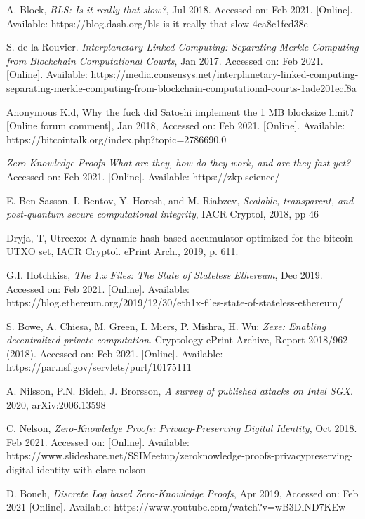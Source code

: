 \documentclass[peerreview]{ieeesyscoin}
\begin{document}
\begin{thebibliography}{00}
  A. Block, \textit{BLS: Is it really that slow?}, Jul 2018. Accessed on: Feb 2021. [Online]. Available: https://blog.dash.org/bls-is-it-really-that-slow-4ca8c1fcd38e

  S. de la Rouvier. \textit{Interplanetary Linked Computing: Separating Merkle Computing from Blockchain Computational Courts}, Jan 2017. Accessed on: Feb 2021. [Online]. Available: https://media.consensys.net/interplanetary-linked-computing-separating-merkle-computing-from-blockchain-computational-courts-1ade201ecf8a

 Anonymous Kid, Why the fuck did Satoshi implement the 1 MB blocksize limit? [Online forum comment], Jan 2018, Accessed on: Feb 2021. [Online]. Available:  https://bitcointalk.org/index.php?topic=2786690.0

 \textit{Zero-Knowledge Proofs What are they, how do they work, and are they fast yet?} Accessed on: Feb 2021. [Online]. Available: https://zkp.science/

 E. Ben-Sasson, I. Bentov, Y. Horesh, and M. Riabzev, \textit{Scalable, transparent, and post-quantum secure computational integrity}, IACR Cryptol, 2018, pp 46 

 Dryja, T, Utreexo: A dynamic hash-based accumulator optimized for the bitcoin UTXO set, IACR Cryptol. ePrint Arch., 2019, p. 611.

 G.I. Hotchkiss, \textit{The 1.x Files: The State of Stateless Ethereum}, Dec 2019. Accessed on: Feb 2021. [Online]. Available:   https://blog.ethereum.org/2019/12/30/eth1x-files-state-of-stateless-ethereum/

 S. Bowe, A. Chiesa, M. Green, I. Miers, P. Mishra, H. Wu: \textit{Zexe: Enabling decentralized private computation}. Cryptology ePrint Archive, Report 2018/962 (2018). Accessed on: Feb 2021. [Online]. Available:  https://par.nsf.gov/servlets/purl/10175111

 A. Nilsson, P.N. Bideh, J. Brorsson, \textit{A survey of published attacks on Intel SGX}. 2020, arXiv:2006.13598

 C. Nelson, \textit{Zero-Knowledge Proofs: Privacy-Preserving Digital Identity}, Oct 2018. Feb 2021. Accessed on: [Online]. Available: https://www.slideshare.net/SSIMeetup/zeroknowledge-proofs-privacypreserving-digital-identity-with-clare-nelson

 D. Boneh, \textit{Discrete Log based Zero-Knowledge Proofs}, Apr 2019,  Accessed on: Feb 2021 [Online].  Available: https://www.youtube.com/watch?v=wB3DlND7KEw


\end{thebibliography}
\end{document}
